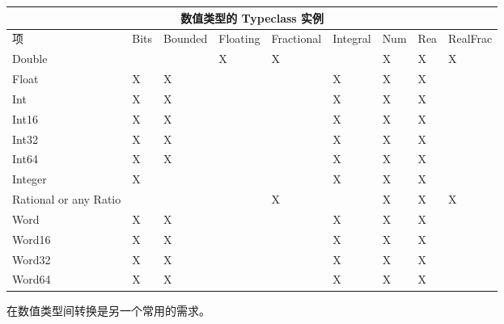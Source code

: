 \documentclass[./main.tex]{subfiles}
\begin{document}
\begin{center}
  \begin{tabular}{|p{1.8cm}|l|l||l|l|l||l|l|l|}
    \hline
    \multicolumn{9}{|c|}{\textbf{数值类型的 Typeclass 实例}}                                                \\
    \hline
    项                     & Bits & Bounded & Floating & Fractional & Integral & Num & Rea & RealFrac \\
    \hline
    Double                &      &         & X        & X          &          & X   & X   & X        \\
    Float                 & X    & X       &          &            & X        & X   & X   &          \\
    Int                   & X    & X       &          &            & X        & X   & X   &          \\
    Int16                 & X    & X       &          &            & X        & X   & X   &          \\
    Int32                 & X    & X       &          &            & X        & X   & X   &          \\
    Int64                 & X    & X       &          &            & X        & X   & X   &          \\
    Integer               & X    &         &          &            & X        & X   & X   &          \\
    Rational or any Ratio &      &         &          & X          &          & X   & X   & X        \\
    Word                  & X    & X       &          &            & X        & X   & X   &          \\
    Word16                & X    & X       &          &            & X        & X   & X   &          \\
    Word32                & X    & X       &          &            & X        & X   & X   &          \\
    Word64                & X    & X       &          &            & X        & X   & X   &          \\
    \hline
  \end{tabular}
\end{center}

在数值类型间转换是另一个常用的需求。
\end{document}
